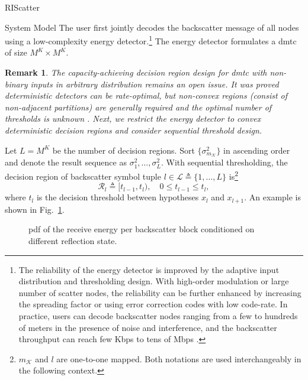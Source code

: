 \documentclass[journal]{IEEEtran}
\newtheorem{remark}{Remark}
\begin{document}
\begin{section}{RIScatter}
\begin{subsection}{System Model}
		The user first jointly decodes the backscatter message of all nodes using a low-complexity energy detector.\footnote{The reliability of the energy detector is improved by the adaptive input distribution and thresholding design. With high-order modulation or large number of scatter nodes, the reliability can be further enhanced by increasing the spreading factor or using error correction codes with low code-rate. In practice, users can decode backscatter nodes ranging from a few to hundreds of meters in the presence of noise and interference, and the backscatter throughput can reach few Kbps to tens of Mbps \cite{Wu2022e}.\label{fn:energy_detector}}
		The energy detector formulates a \gls{dmtc} of size $M^K \times M^K$.

		\begin{remark}
			The capacity-achieving decision region design for \gls{dmtc} with non-binary inputs in arbitrary distribution remains an open issue.
			It was proved deterministic detectors can be rate-optimal, but non-convex regions (consist of non-adjacent partitions) are generally required and the optimal number of thresholds is unknown \cite{Nguyen2018,Nguyen2021}.
			Next, we restrict the energy detector to convex deterministic decision regions and consider sequential threshold design.
		\end{remark}

		Let $L = M^K$ be the number of decision regions.
		Sort $\{\sigma_{m_{\mathcal{K}}}^2\}$ in ascending order and denote the result sequence as $\sigma_1^2,\ldots,\sigma_L^2$.
		With sequential thresholding, the decision region of backscatter symbol tuple $l \in \mathcal{L} \triangleq \{1,\ldots,L\}$ is\footnote{$m_{\mathcal{K}}$ and $l$ are one-to-one mapped. Both notations are used interchangeably in the following context.}
		\begin{equation}
			\mathcal{R}_{l} \triangleq [t_{l-1},t_l), \quad 0 \le t_{l-1} \le t_l,
		\end{equation}
		where $t_l$ is the decision threshold between hypotheses $x_{l}$ and $x_{l+1}$.
		An example is shown in Fig.~\ref{fg:energy_distribution}.

		\begin{figure}[!t]
			\centering
			\resizebox{0.8\columnwidth}{!}{
				
			}
			\caption{
				\gls{pdf} of the receive energy per backscatter block conditioned on different reflection state.
			}
			\label{fg:energy_distribution}
		\end{figure}


\end{subsection}
\end{section}
\end{document}
